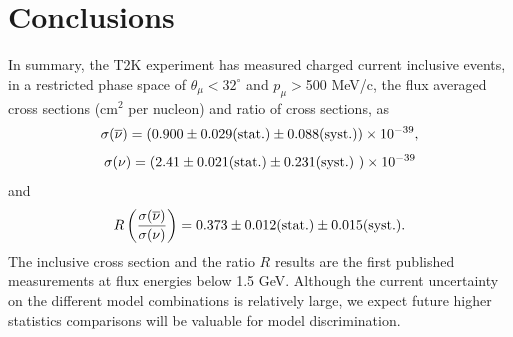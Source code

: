 \section{Conclusions}
In summary, the T2K experiment has measured charged current inclusive events, in a restricted phase
space of $\theta_{\mu}<32^{\circ}$ and $p_{\mu}>$500 MeV/c,
the flux averaged cross sections (cm$^{2}$ per nucleon) and ratio
of cross sections, as
\begin{equation}
\sigma(\overline{\nu})=\left(0.900\pm0.029{\rm (stat.)}\pm0.088{\rm (syst.)}\right)\times10^{-39},\label{eq:conclusion-1}
\end{equation}
\begin{equation}
\sigma(\nu)=\left(2.41\pm0.021{\rm (stat.)}\pm0.231{\rm (syst.)}\ \right)\times10^{-39}\label{eq:conclusion-2}
\end{equation}
and
\begin{equation}
R\left(\frac{\sigma(\overline{\nu})}{\sigma(\nu)}\right)=0.373\pm0.012{\rm (stat.)}\pm0.015{\rm (syst.).}\label{eq:conclusion-3}
\end{equation}
The \nubar inclusive cross section and the ratio $R$ results
are the first published measurements at \nuandnubar flux energies\citep{flux-model} below
1.5 GeV.  Although the current uncertainty on the different model combinations is relatively large, 
we expect future higher statistics comparisons will be valuable for model discrimination.
